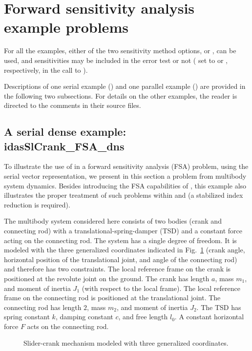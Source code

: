 \section{Forward sensitivity analysis example problems}\label{s:fwd_ex}

For all the {\idas} examples, either of the two sensitivity method options,
 or , can be used, 
and sensitivities may be included in the error test or not 
( set to  or , respectively, in the
call to ).

Descriptions of one serial example () and
one parallel example () are provided
in the following two subsections.  For details on the other examples,
the reader is directed to the comments in their source files.



\subsection{A serial dense example: idasSlCrank\_FSA\_dns}
\label{ss:idasSlCrank_FSA_dns}
To illustrate the use of {\idas} in a forward sensitivity analysis (FSA) problem, using
the serial vector representation, we present in this section a problem from
multibody system dynamics. Besides introducing the FSA capabilities of {\idas},
this example also illustrates the proper treatment of such problems within {\ida} and {\idas}
(a stabilized index reduction is required). 

The multibody system considered here consists of two bodies (crank and connecting
rod) with a translational-spring-damper (TSD) and a constant force acting on the
connecting rod.  The system has a single degree of freedom. It is modeled with the
three generalized coordinates indicated in Fig.~\ref{f:sl_crank}
(crank angle, horizontal position of the translational joint, and angle of the connecting rod)
and therefore has two constraints. The local reference frame on the crank is positioned at 
the revolute joint on the ground.  The crank has length $a$, mass $m_1$, and moment of 
inertia $J_1$ (with respect to the local frame).  The local reference frame on the connecting 
rod is positioned at the translational joint.  The connecting rod has length $2$, mass $m_2$, 
and moment of inertia $J_2$.
The TSD has spring constant $k$, damping constant $c$, and free length $l_0$.
A constant horizontal force $F$ acts on the connecting rod.
\begin{figure}[h]
  {\centerline{}}
  \caption{Slider-crank mechanism modeled with three generalized coordinates.}
  \label{f:sl_crank}
\end{figure}

